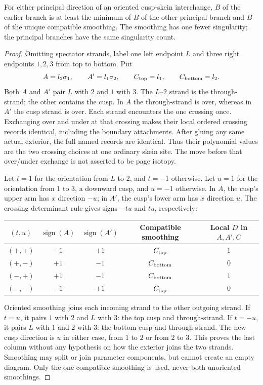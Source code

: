 \begin{lemma}\label{ng:cusp-skein}\leanok
For either principal direction of an oriented cusp-skein interchange,
$B$ of the earlier branch is at least the minimum of $B$ of the other
principal branch and $B$ of the unique compatible smoothing. The
smoothing has one fewer singularity; the principal branches have the
same singularity count.

\end{lemma}
\begin{proof}\leanok
Omitting spectator strands, label one left endpoint $L$ and three
right endpoints $1,2,3$ from top to bottom. Put
\begin{equation}\label{ng:cusp-words}
 A=l_2\sigma_1,\qquad A'=l_1\sigma_2,\qquad
 C_{\rm top}=l_1,\qquad C_{\rm bottom}=l_2.
\end{equation}
Both $A$ and $A'$ pair $L$ with $2$ and $1$ with $3$. The $L$--$2$
strand is the through-strand; the other contains the cusp. In $A$ the
through-strand is over, whereas in $A'$ the cusp strand is over.
Each strand encounters the one crossing once. Exchanging over and under
at that crossing makes their local ordered crossing records identical,
including the boundary attachments. After gluing any same actual
exterior, the full named records are identical. Thus their polynomial
values are the two crossing choices at one ordinary skein site. The
move before that over/under exchange is not asserted to be page isotopy.

Let $t=1$ for the orientation from $L$ to $2$, and $t=-1$ otherwise.
Let $u=1$ for the orientation from $1$ to $3$, a downward cusp, and
$u=-1$ otherwise. In $A$, the cusp's upper arm has $x$ direction $-u$;
in $A'$, the cusp's lower arm has $x$ direction $u$. The crossing
determinant rule gives signs $-tu$ and $tu$, respectively:
\begin{center}
\begin{tabular}{@{}ccccc@{}}
$(t,u)$ & $\operatorname{sign}(A)$ & $\operatorname{sign}(A')$
 & Compatible smoothing & Local $D$ in $A,A',C$\\
\hline
$(+,+)$ & $-1$ & $+1$ & $C_{\rm top}$    & $1$\\
$(+,-)$ & $+1$ & $-1$ & $C_{\rm bottom}$ & $0$\\
$(-,+)$ & $+1$ & $-1$ & $C_{\rm bottom}$ & $1$\\
$(-,-)$ & $-1$ & $+1$ & $C_{\rm top}$    & $0$
\end{tabular}
\end{center}
Oriented smoothing joins each incoming strand to the other outgoing
strand. If $t=u$, it pairs $1$ with $2$ and $L$ with $3$: the top cusp
and through-strand. If $t=-u$, it pairs $L$ with $1$ and $2$ with $3$:
the bottom cusp and through-strand. The new cusp direction is $u$ in
either case, from $1$ to $2$ or from $2$ to $3$. This proves the last
column without any hypothesis on how the exterior joins the two strands.
Smoothing may split or join parameter components, but cannot create an
empty diagram. Only the one compatible smoothing is used, never both
unoriented smoothings.


\end{proof}
